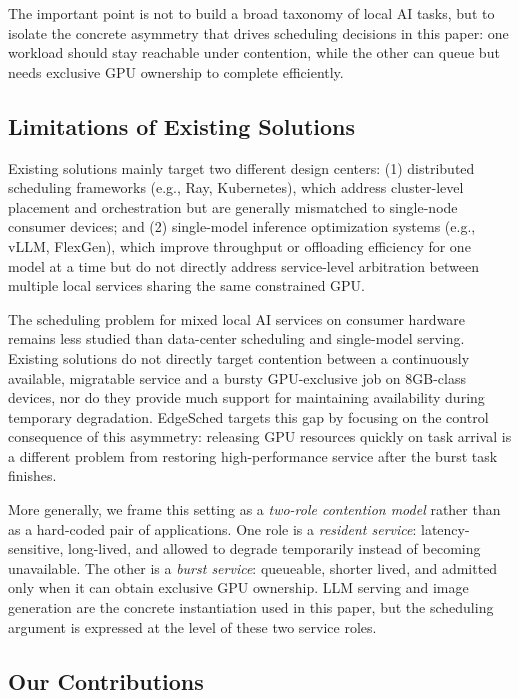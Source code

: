 The important point is not to build a broad taxonomy of local AI tasks, but to isolate the concrete asymmetry that drives scheduling decisions in this paper: one workload should stay reachable under contention, while the other can queue but needs exclusive GPU ownership to complete efficiently.

\subsection{Limitations of Existing Solutions}

Existing solutions mainly target two different design centers: (1) distributed scheduling frameworks (e.g., Ray, Kubernetes), which address cluster-level placement and orchestration but are generally mismatched to single-node consumer devices; and (2) single-model inference optimization systems (e.g., vLLM, FlexGen), which improve throughput or offloading efficiency for one model at a time but do not directly address service-level arbitration between multiple local services sharing the same constrained GPU.

The scheduling problem for mixed local AI services on consumer hardware remains less studied than data-center scheduling and single-model serving. Existing solutions do not directly target contention between a continuously available, migratable service and a bursty GPU-exclusive job on 8GB-class devices, nor do they provide much support for maintaining availability during temporary degradation. EdgeSched targets this gap by focusing on the control consequence of this asymmetry: releasing GPU resources quickly on task arrival is a different problem from restoring high-performance service after the burst task finishes.

More generally, we frame this setting as a \emph{two-role contention model} rather than as a hard-coded pair of applications. One role is a \emph{resident service}: latency-sensitive, long-lived, and allowed to degrade temporarily instead of becoming unavailable. The other is a \emph{burst service}: queueable, shorter lived, and admitted only when it can obtain exclusive GPU ownership. LLM serving and image generation are the concrete instantiation used in this paper, but the scheduling argument is expressed at the level of these two service roles.

\subsection{Our Contributions}

